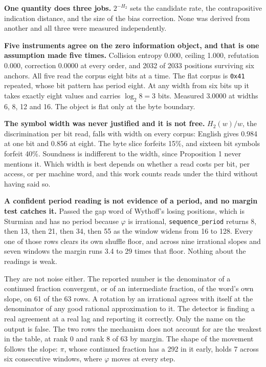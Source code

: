 \textbf{One quantity does three jobs.} \(2^{-H_2}\) sets the candidate rate, the contrapositive indication distance, and the size of the bias correction. None was derived from another and all three were measured independently.

\textbf{Five instruments agree on the zero information object, and that is one assumption made five times.} Collision entropy 0.000, ceiling 1.000, refutation 0.000, correction 0.0000 at every order, and 2032 of 2033 positions surviving six anchors. All five read the corpus eight bits at a time. The flat corpus is \texttt{0x41} repeated, whose bit pattern has period eight. At any width from six bits up it takes exactly eight values and carries \(\log_2 8 = 3\) bits. Measured 3.0000 at widths 6, 8, 12 and 16. The object is flat only at the byte boundary.

\textbf{The symbol width was never justified and it is not free.} \(H_2(w)/w\), the discrimination per bit read, falls with width on every corpus: English gives 0.984 at one bit and 0.856 at eight. The byte slice forfeits 15\%, and sixteen bit symbols forfeit 40\%. Soundness is indifferent to the width, since Proposition 1 never mentions it. Which width is best depends on whether a read costs per bit, per access, or per machine word, and this work counts reads under the third without having said so.

\textbf{A confident period reading is not evidence of a period, and no margin test catches it.} Passed the gap word of Wythoff's losing positions, which is Sturmian and has no period because \(\varphi\) is irrational, \texttt{sequence\_period} returns 8, then 13, then 21, then 34, then 55 as the window widens from 16 to 128. Every one of those rows clears its own shuffle floor, and across nine irrational slopes and seven windows the margin runs 3.4 to 29 times that floor. Nothing about the readings is weak.

They are not noise either. The reported number is the denominator of a continued fraction convergent, or of an intermediate fraction, of the word's own slope, on 61 of the 63 rows. A rotation by an irrational agrees with itself at the denominator of any good rational approximation to it. The detector is finding a real agreement at a real lag and reporting it correctly. Only the name on the output is false. The two rows the mechanism does not account for are the weakest in the table, at rank 0 and rank 8 of 63 by margin. The shape of the movement follows the slope: \(\pi\), whose continued fraction has a 292 in it early, holds 7 across six consecutive windows, where \(\varphi\) moves at every step.


